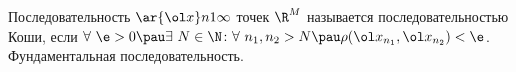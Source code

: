
	 Последовательность $\ar {\ol x}n1\infty $ точек $\R^M$ называется последовательностью Коши,
	  если $\forall \ \e>0\pau \exists \ N\in\N\colon \forall \ n_1,n_2>N\pau \rho(\ol x_{n_1},\ol x_{n_2})<\e$.
	 Фундаментальная последовательность.
	 